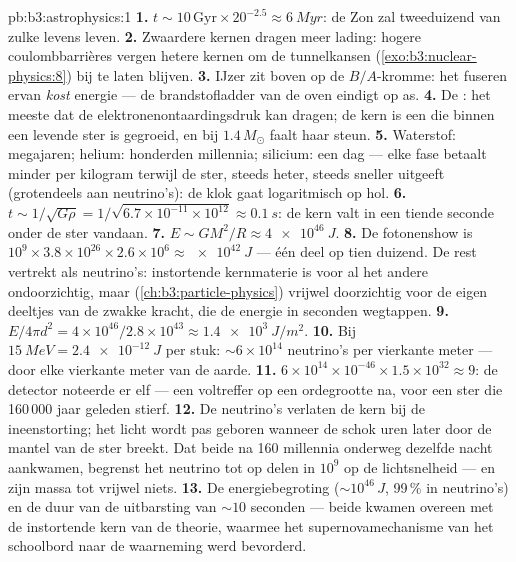 \begin{solution}{pb:b3:astrophysics:1}
\textbf{1.} $t \sim 10\,\text{Gyr}\times20^{-2.5} \approx
\qty{6}{Myr}$: de Zon zal tweeduizend van zulke levens leven.
\textbf{2.} Zwaardere kernen dragen meer lading: hogere coulomb\-barrières
vergen hetere kernen om de tunnelkansen
(\cref{exo:b3:nuclear-physics:8}) bij te laten blijven.
\textbf{3.} IJzer zit boven op de $B/A$-kromme: het fuseren ervan
\emph{kost} energie --- de brandstofladder van de oven eindigt op as.
\textbf{4.} De : het meeste dat de
elektronenontaardingsdruk kan dragen; de kern is een  die
binnen een levende ster is gegroeid, en bij $1.4\,M_\odot$ faalt haar steun.
\textbf{5.} Waterstof: megajaren; helium: honderden millennia;
silicium: een dag --- elke fase betaalt minder per kilogram terwijl de
ster, steeds heter, steeds sneller uitgeeft (grotendeels aan neutrino's):
de klok gaat logaritmisch op hol.
\textbf{6.} $t \sim 1/\sqrt{G\rho} =
1/\sqrt{6.7\times10^{-11}\times10^{12}} \approx \qty{0.1}{s}$:
de kern valt in een tiende seconde onder de ster vandaan.
\textbf{7.} $E \sim GM^2/R \approx \qty{4e46}{J}$.
\textbf{8.} De fotonenshow is $10^9\times3.8\times10^{26}
\times2.6\times10^{6} \approx \qty{e42}{J}$ --- één deel op tien
duizend. De rest vertrekt als neutrino's: instortende kernmaterie
is voor al het andere ondoorzichtig, maar
(\cref{ch:b3:particle-physics}) vrijwel doorzichtig voor de eigen deeltjes
van de zwakke kracht, die de energie in seconden wegtappen.
\textbf{9.} $E/4\pi d^2 = 4\times10^{46}/2.8\times10^{43}
\approx \qty{1.4e3}{J/m^2}$.
\textbf{10.} Bij $\qty{15}{MeV} = \qty{2.4e-12}{J}$ per stuk:
${\sim}6\times10^{14}$ neutrino's per vierkante meter --- door
elke vierkante meter van de aarde.
\textbf{11.} $6\times10^{14}\times10^{-46}\times1.5\times
10^{32} \approx 9$: de detector noteerde er elf --- een
voltreffer op een ordegrootte na, voor een ster die 160\,000 jaar
geleden stierf.
\textbf{12.} De neutrino's verlaten de kern bij de ineenstorting; het
licht wordt pas geboren wanneer de schok uren later door de mantel van de
ster breekt. Dat beide na 160 millennia onderweg dezelfde nacht aankwamen,
begrenst het neutrino tot op delen in $10^{9}$ op de lichtsnelheid
--- en zijn massa tot vrijwel niets.
\textbf{13.} De energiebegroting ($\sim10^{46}\,\unit{J}$, 99\,\%
in neutrino's) en de duur van de uitbarsting van ${\sim}10$ seconden ---
beide kwamen overeen met de instortende kern van de theorie, waarmee het
supernovamechanisme van het schoolbord naar de waarneming werd bevorderd.

\end{solution}
